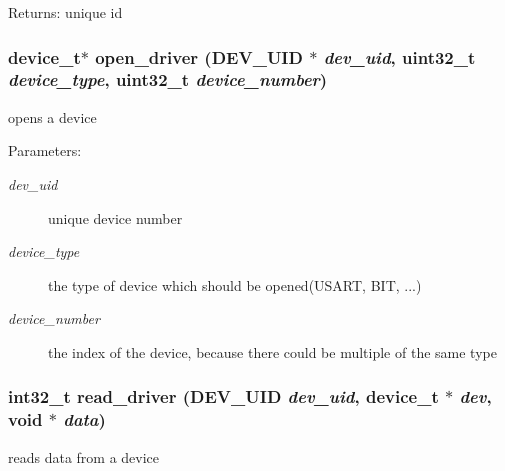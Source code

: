 \begin{Desc}
\item[Returns:]unique id \end{Desc}
\hypertarget{group__device__driver_gf52df4f2578f48dbe154d5cb1643e7a7}{
\subsubsection[{open\_\-driver}]{\setlength{\rightskip}{0pt plus 5cm}device\_\-t$\ast$ open\_\-driver ({\bf DEV\_\-UID} $\ast$ {\em dev\_\-uid}, \/  uint32\_\-t {\em device\_\-type}, \/  uint32\_\-t {\em device\_\-number})}}
\label{group__device__driver_gf52df4f2578f48dbe154d5cb1643e7a7}


opens a device 

\begin{Desc}
\item[Parameters:]
\begin{description}
\item[{\em dev\_\-uid}]unique device number \item[{\em device\_\-type}]the type of device which should be opened(USART, BIT, ...) \item[{\em device\_\-number}]the index of the device, because there could be multiple of the same type \end{description}
\end{Desc}
\hypertarget{group__device__driver_g908734a3944d1f0d08ba5490c13e1ac6}{
\subsubsection[{read\_\-driver}]{\setlength{\rightskip}{0pt plus 5cm}int32\_\-t read\_\-driver ({\bf DEV\_\-UID} {\em dev\_\-uid}, \/  device\_\-t $\ast$ {\em dev}, \/  void $\ast$ {\em data})}}
\label{group__device__driver_g908734a3944d1f0d08ba5490c13e1ac6}


reads data from a device 

